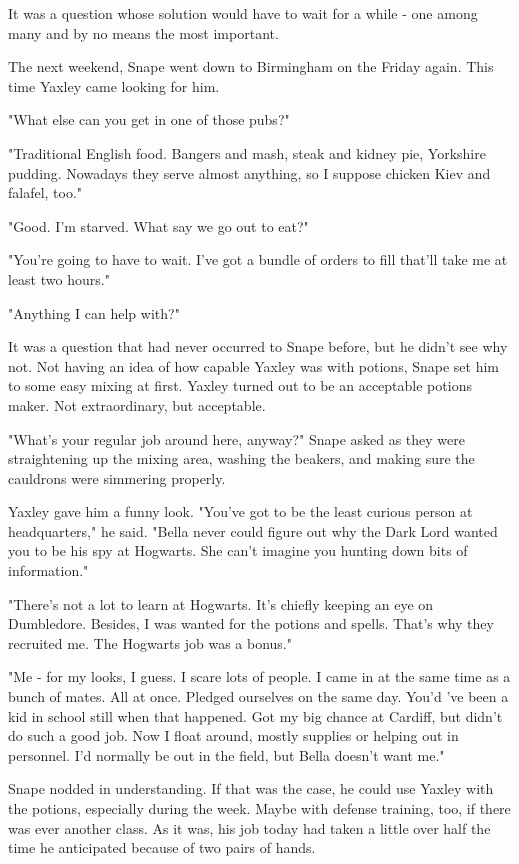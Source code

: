 \documentclass[a4paper,11pt]{article}
\begin{document}
It was a question whose solution would have to wait for a while - one among many and by no means the most important.

The next weekend, Snape went down to Birmingham on the Friday again. This time Yaxley came looking for him.

"What else can you get in one of those pubs?"

"Traditional English food. Bangers and mash, steak and kidney pie, Yorkshire pudding. Nowadays they serve almost anything, so I suppose chicken Kiev and falafel, too."

"Good. I'm starved. What say we go out to eat?"

"You're going to have to wait. I've got a bundle of orders to fill that'll take me at least two hours."

"Anything I can help with?"

It was a question that had never occurred to Snape before, but he didn't see why not. Not having an idea of how capable Yaxley was with potions, Snape set him to some easy mixing at first. Yaxley turned out to be an acceptable potions maker. Not extraordinary, but acceptable.

"What's your regular job around here, anyway?" Snape asked as they were straightening up the mixing area, washing the beakers, and making sure the cauldrons were simmering properly.

Yaxley gave him a funny look. "You've got to be the least curious person at headquarters," he said. "Bella never could figure out why the Dark Lord wanted you to be his spy at Hogwarts. She can't imagine you hunting down bits of information."

"There's not a lot to learn at Hogwarts. It's chiefly keeping an eye on Dumbledore. Besides, I was wanted for the potions and spells. That's why they recruited me. The Hogwarts job was a bonus."

"Me - for my looks, I guess. I scare lots of people. I came in at the same time as a bunch of mates. All at once. Pledged ourselves on the same day. You'd 've been a kid in school still when that happened. Got my big chance at Cardiff, but didn't do such a good job. Now I float around, mostly supplies or helping out in personnel. I'd normally be out in the field, but Bella doesn't want me."

Snape nodded in understanding. If that was the case, he could use Yaxley with the potions, especially during the week. Maybe with defense training, too, if there was ever another class. As it was, his job today had taken a little over half the time he anticipated because of two pairs of hands.
\end{document}
